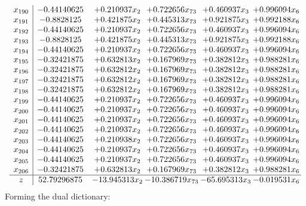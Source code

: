 \documentclass[11pt]{article}
\begin{document}
\[\begin{array}{c| c c@{\hskip 2pt} c@{\hskip 2pt} c@{\hskip 2pt} c@{\hskip 2pt} }
 x_{190}   &  -0.44140625 & + 0.210937 x_{2} & + 0.722656 x_{73} & + 0.460937 x_{3} & + 0.996094 x_{6}\\
 x_{191}   &  -0.8828125 & + 0.421875 x_{2} & + 0.445313 x_{73} & + 0.921875 x_{3} & + 0.992188 x_{6}\\
 x_{192}   &  -0.44140625 & + 0.210937 x_{2} & + 0.722656 x_{73} & + 0.460937 x_{3} & + 0.996094 x_{6}\\
 x_{193}   &  -0.8828125 & + 0.421875 x_{2} & + 0.445313 x_{73} & + 0.921875 x_{3} & + 0.992188 x_{6}\\
 x_{194}   &  -0.44140625 & + 0.210937 x_{2} & + 0.722656 x_{73} & + 0.460937 x_{3} & + 0.996094 x_{6}\\
 x_{195}   &  -0.32421875 & + 0.632813 x_{2} & + 0.167969 x_{73} & + 0.382812 x_{3} & + 0.988281 x_{6}\\
 x_{196}   &  -0.32421875 & + 0.632812 x_{2} & + 0.167969 x_{73} & + 0.382812 x_{3} & + 0.988281 x_{6}\\
 x_{197}   &  -0.32421875 & + 0.632812 x_{2} & + 0.167969 x_{73} & + 0.382812 x_{3} & + 0.988281 x_{6}\\
 x_{198}   &  -0.32421875 & + 0.632812 x_{2} & + 0.167969 x_{73} & + 0.382812 x_{3} & + 0.988281 x_{6}\\
 x_{199}   &  -0.44140625 & + 0.210937 x_{2} & + 0.722656 x_{73} & + 0.460937 x_{3} & + 0.996094 x_{6}\\
 x_{200}   &  -0.44140625 & + 0.210937 x_{2} & + 0.722656 x_{73} & + 0.460937 x_{3} & + 0.996094 x_{6}\\
 x_{201}   &  -0.44140625 & + 0.210937 x_{2} & + 0.722656 x_{73} & + 0.460937 x_{3} & + 0.996094 x_{6}\\
 x_{202}   &  -0.44140625 & + 0.210937 x_{2} & + 0.722656 x_{73} & + 0.460937 x_{3} & + 0.996094 x_{6}\\
 x_{203}   &  -0.44140625 & + 0.210938 x_{2} & + 0.722656 x_{73} & + 0.460937 x_{3} & + 0.996094 x_{6}\\
 x_{204}   &  -0.44140625 & + 0.210937 x_{2} & + 0.722656 x_{73} & + 0.460937 x_{3} & + 0.996094 x_{6}\\
 x_{205}   &  -0.44140625 & + 0.210937 x_{2} & + 0.722656 x_{73} & + 0.460937 x_{3} & + 0.996094 x_{6}\\
 x_{206}   &  -0.32421875 & + 0.632813 x_{2} & + 0.167969 x_{73} & + 0.382812 x_{3} & + 0.988281 x_{6}\\
\hline
z    &  52.79296875 & -13.945313 x_{2} & -10.386719 x_{73} & -65.695313 x_{3} & -0.019531 x_{6}\\
\end{array}\]
Forming the dual dictionary:
\end{document}
